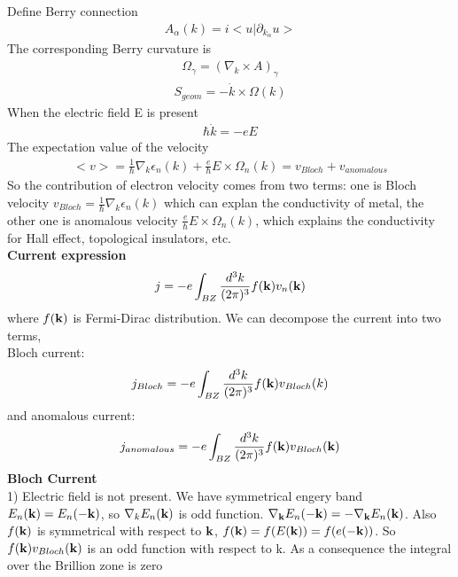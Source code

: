 \documentclass[a4paper]{article}
\begin{document}
Define Berry connection
\begin{align*}
A_{\alpha}(k) = i<u|\partial_{k_{\alpha}}u>
\end{align*}
The corresponding Berry curvature is
\begin{align*}
\Omega_{\gamma} = (\nabla_k \times A)_{\gamma}
\end{align*}
\begin{align*}
S_{geom} = - \dot k \times \Omega(k)
\end{align*}
When the electric field E is present
\begin{align*}
\hbar \dot k = -e E
\end{align*}
The expectation value of the velocity
\begin{align*}
<v> = \frac{1}{\hbar}\nabla_k \epsilon_n(k) + \frac{e}{\hbar} E \times \Omega_n(k)
       = v_{Bloch} + v_{anomalous}
\end{align*}
So the contribution of electron velocity comes from two terms: one is Bloch velocity $v_{Bloch} =  \frac{1}{\hbar}\nabla_k \epsilon_n(k)$ which can explan the conductivity of metal, the other one is anomalous velocity $\frac{e}{\hbar} E \times \Omega_n(k)$, which explains the conductivity for Hall effect, topological insulators, etc.\\
{\bf Current expression}
\begin{align*}
j = -e \int_{BZ}\frac{d^3k}{(2\pi)^3} f({\bf k}) v_n({\bf k})
\end{align*}
where $f({\bf k})$ is Fermi-Dirac distribution.
We can decompose the current into two terms,\\
Bloch current:\\
\begin{align*}
j_{Bloch} = -e \int_{BZ}\frac{d^3k}{(2\pi)^3} f({\bf k}) v_{Bloch}({\bf }k)
\end{align*}
and anomalous current:\\
\begin{align*}
j_{anomalous} = -e \int_{BZ}\frac{d^3k}{(2\pi)^3} f({\bf k}) v_{Bloch}({\bf k})
\end{align*}
{\bf Bloch Current}\\
1) Electric field is not present. We have symmetrical engery band $E_n({\bf k}) = E_n(-{\bf k})$, so $\nabla_k E_n({\bf k})$ is odd function. $\nabla_{\bf k} E_n(-{\bf k}) = - \nabla_{\bf k} E_n({\bf k})$. Also $f({\bf k})$ is symmetrical with respect to ${\bf k}$, $f({\bf k}) = f(E({\bf k}))=f(e({\bf -k}))$. So $ f({\bf k}) v_{Bloch}({\bf k})$ is an odd function with respect to k. As a consequence the integral over the Brillion zone is zero
\end{document}
